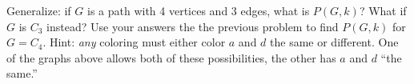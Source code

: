 \documentclass[11pt]{exam}
\newcommand{\vtx}[2]{node[fill,circle,inner sep=0pt, minimum size=4pt,label=#1:#2]{}}
\newcommand{\vr}[1]{\vtx{right}{#1}}
\newcommand{\vl}[1]{\vtx{left}{#1}}
\begin{document}
\begin{questions}
  \question Generalize: if $G$ is a path with 4 vertices and 3 edges, what is $P(G,k)$?  What if $G$ is $C_3$ instead?
  \vfill
  \vfill
  \question Use your answers the the previous problem to find $P(G,k)$ for $G = C_4$.  Hint: \emph{any} coloring must either color $a$ and $d$ the same or different.  One of the graphs above allows both of these possibilities, the other has $a$ and $d$ ``the same.''
  \begin{tiny}
    \begin{center}
    \end{center}
  \end{tiny}
  \vfill

\end{questions}
\end{document}
